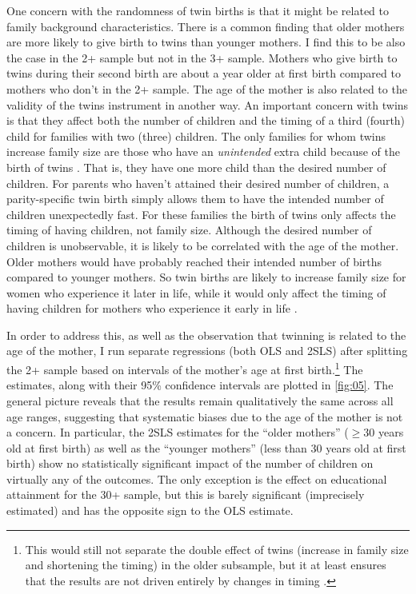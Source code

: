 One concern with the randomness of twin births is that it might be related to family background characteristics. There is a common finding that older mothers are more likely to give birth to twins than younger mothers. I find this to be also the case in the 2+ sample but not in the 3+ sample. Mothers who give birth to twins during their second birth are about a year older at first birth compared to mothers who don't in the 2+ sample. The age of the mother is also related to the validity of the twins instrument in another way. An important concern with twins is that they affect both the number of children and the timing of a third (fourth) child for families with two (three) children. The only families for whom twins increase family size are those who have an \textit{unintended} extra child because of the birth of twins \parencite{oberg_casual_2021}. That is, they have one more child than the desired number of children. For parents who haven’t attained their desired number of children, a parity-specific twin birth simply allows them to have the intended number of children unexpectedly fast. For these families the birth of twins only affects the timing of having children, not family size. Although the desired number of children is unobservable, it is likely to be correlated with the age of the mother. Older mothers would have probably reached their intended number of births compared to younger mothers. So twin births are likely to increase family size for women who experience it later in life, while it would only affect the timing of having children for mothers who experience it early in life \parencite{caceres-delpiano_impacts_2006}. 

In order to address this, as well as the observation that twinning is related to the age of the mother, I run separate regressions (both OLS and 2SLS) after splitting the 2+ sample based on intervals of the mother's age at first birth.\footnote{ This would still not separate the double effect of twins (increase in family size and shortening the timing) in the older subsample, but it at least ensures that the results are not driven entirely by changes in timing \parencite[see][p.~751]{caceres-delpiano_impacts_2006}. } The estimates, along with their 95\% confidence intervals are plotted in \autoref{fig:05}. The general picture reveals that the results remain qualitatively the same across all age ranges, suggesting that systematic biases due to the age of the mother is not a concern. In particular, the 2SLS estimates for the \enquote{older mothers} ($ \geq 30 $ years old at first birth) as well as the \enquote{younger mothers} (less than 30 years old at first birth) show no statistically significant impact of the number of children on virtually any of the outcomes. The only exception is the effect on educational attainment for the 30+ sample, but this is barely significant (imprecisely estimated) and has the opposite sign to the OLS estimate. 

